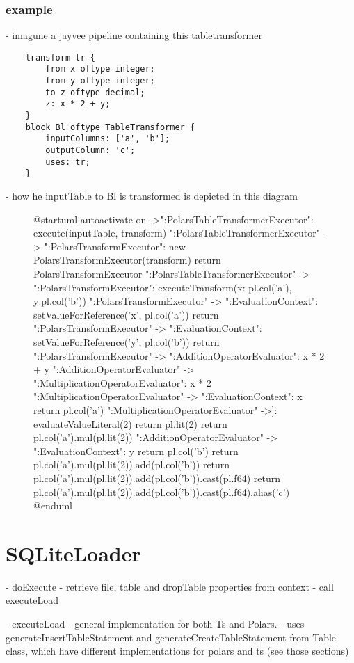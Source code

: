 \subsubsection{example}
- imagune a jayvee pipeline containing this tabletransformer \
\begin{verbatim}
	transform tr {
		from x oftype integer;
		from y oftype integer;
		to z oftype decimal;
		z: x * 2 + y;
	}
	block Bl oftype TableTransformer {
		inputColumns: ['a', 'b'];
		outputColumn: 'c';
		uses: tr;
	}
\end{verbatim}
- how he inputTable to Bl is transformed is depicted in this diagram
\begin{figure}
	\begin{plantuml}
		@startuml
		autoactivate on
		->":PolarsTableTransformerExecutor": execute(inputTable, transform)
		":PolarsTableTransformerExecutor" -> ":PolarsTransformExecutor": new PolarsTransformExecutor(transform)
		return PolarsTransformExecutor
		":PolarsTableTransformerExecutor" -> ":PolarsTransformExecutor": executeTransform({x: pl.col('a'), y:pl.col('b')})
		":PolarsTransformExecutor" -> ":EvaluationContext": setValueForReference('x', pl.col('a'))
		return
		":PolarsTransformExecutor" -> ":EvaluationContext": setValueForReference('y', pl.col('b'))
		return
		":PolarsTransformExecutor" -> ":AdditionOperatorEvaluator": x * 2 + y
		":AdditionOperatorEvaluator" -> ":MultiplicationOperatorEvaluator": x * 2
		":MultiplicationOperatorEvaluator" -> ":EvaluationContext": x
		return pl.col('a')
		":MultiplicationOperatorEvaluator" ->]: evaluateValueLiteral(2)
		return pl.lit(2)
		return pl.col('a').mul(pl.lit(2))
		":AdditionOperatorEvaluator" -> ":EvaluationContext": y
		return pl.col('b')
		return pl.col('a').mul(pl.lit(2)).add(pl.col('b'))
		return pl.col('a').mul(pl.lit(2)).add(pl.col('b')).cast(pl.f64)
		return \n pl.col('a').mul(pl.lit(2)).add(pl.col('b')).cast(pl.f64).alias('c')
		@enduml
	\end{plantuml}
	\caption{}
	\label{fig:uml:epr:example}
\end{figure}




\section{SQLiteLoader}
- doExecute
- retrieve file, table and dropTable properties from context
- call executeLoad

- executeLoad
- general implementation for both Ts and Polars.
- uses generateInsertTableStatement and generateCreateTableStatement from Table class, which have different implementations for polars and ts (see those sections)


